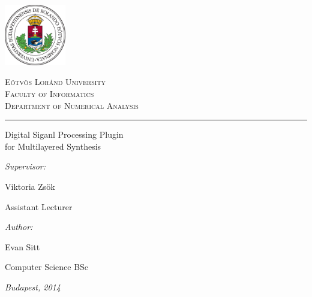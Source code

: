 \begin{titlepage}

\noindent
\parbox[m]{0.2\textwidth}{
 \includegraphics[width=0.2\textwidth]{elte_logo_color.eps} %
}
\hfill
\parbox[m]{0.7\textwidth}{
\begin{center}
\begin{large}
\textsc{
E\"otv\"os Lor\'and University\\
\vspace{0.5pc}
Faculty of Informatics\\
\vspace{0.5pc}
Department of Numerical Analysis\\
}
\end{large}
\end{center}
}

\vspace{1pc}
\hrule

\vfill

\begin{center}
{\LARGE Digital Siganl Processing Plugin\\for Multilayered Synthesis}
\end{center}

\vfill

\noindent
\hspace*{0.05\textwidth}
\parbox{0.45\textwidth}{
{\it Supervisor:}
\bigskip

{\Large Viktoria Zs\"ok}
\smallskip

Assistant Lecturer
}
\hfill
\parbox{0.45\textwidth}{
{\it Author:}
\bigskip

{\Large Evan Sitt}
\smallskip

Computer Science BSc
}


\vfill

\begin{center}
{\large {\it Budapest, 2014}}
\end{center}

\end{titlepage}
